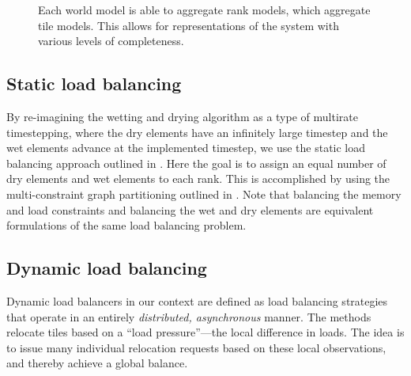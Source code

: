 \begin{figure}
  \centering
{}
\caption{Each world model is able to aggregate rank models, which aggregate tile models. This allows for representations of the system with various levels of completeness.}
\label{fig:localmodels}
\end{figure}

\subsection{Static load balancing}

By re-imagining the wetting and drying algorithm as a type of multirate timestepping, where the dry elements have an infinitely large timestep and the wet elements advance at the implemented timestep, we use the static load balancing approach outlined in \cite{Seny2014}. Here the goal is to assign an equal number of dry elements and wet elements to each rank. This is accomplished by using the multi-constraint graph partitioning outlined in \cite{Karypis1998b}. Note that balancing the memory and load constraints and balancing the wet and dry elements are equivalent formulations of the same load balancing problem.

\subsection{Dynamic load balancing}
Dynamic load balancers in our context are defined as load balancing strategies that operate in an entirely {\em distributed, asynchronous}  manner.
The methods relocate tiles based on a ``load pressure''---the local difference in loads. The idea is to issue many individual relocation requests based on these local observations, and thereby achieve a global balance.

